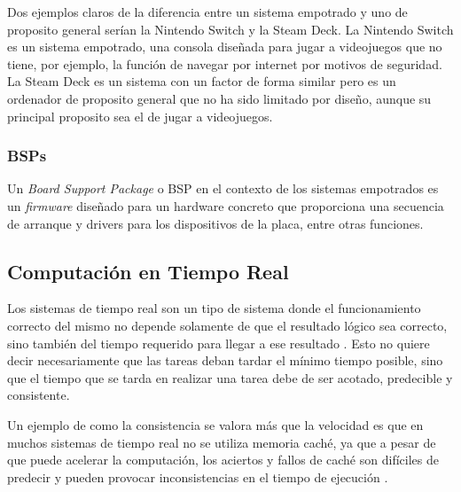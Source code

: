 Dos ejemplos claros de la diferencia entre un sistema empotrado y uno de proposito general serían la Nintendo Switch y la Steam Deck. La Nintendo Switch es un sistema empotrado, una consola diseñada para jugar a videojuegos que no tiene, por ejemplo, la función de navegar por internet por motivos de seguridad. La Steam Deck es un sistema con un factor de forma similar pero es un ordenador de proposito general que no ha sido limitado por diseño, aunque su principal proposito sea el de jugar a videojuegos.


\begin{center} \colorbox{yellow!10} {  } \end{center}

\subsubsection{BSPs}
Un \textit{Board Support Package} o BSP en el contexto de los sistemas empotrados es un \textit{firmware} diseñado para un hardware concreto que proporciona una secuencia de arranque y drivers para los dispositivos de la placa, entre otras funciones.


\subsection{Computación en Tiempo Real}
Los sistemas de tiempo real son un tipo de sistema donde el funcionamiento correcto del mismo no depende solamente de que el resultado lógico sea correcto, sino también del tiempo requerido para llegar a ese resultado \cite{stankovic}. Esto no quiere decir necesariamente que las tareas deban tardar el mínimo tiempo posible, sino que el tiempo que se tarda en realizar una tarea debe de ser acotado, predecible y consistente.

Un ejemplo de como la consistencia se valora más que la velocidad es que en muchos sistemas de tiempo real no se utiliza memoria caché, ya que a pesar de que puede acelerar la computación, los aciertos y fallos de caché son difíciles de predecir y pueden provocar inconsistencias en el tiempo de ejecución \cite{MILLIGAN1996}.

